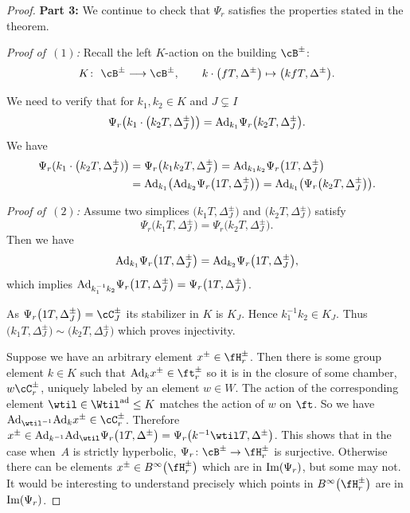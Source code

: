 \begin{proof}
{\bf Part 3:} We continue to check that $\Psi_r$ satisfies the properties stated in the theorem.

{\em Proof of~$(1)$:} Recall the left $K$-action on the building $\cB^\pm$:
\begin{displaymath}
K\colon \ \cB^\pm \longrightarrow \cB^\pm,\qquad k\cdot \big(fT, \Delta^\pm\big)\mapsto \big(kfT, \Delta^\pm\big).
\end{displaymath}

We need to verify that for $k_1,k_2\in K$ and $J\subsetneq I$
\[\Psi_r\big( k_1 \cdot\big(k_2T, \Delta^\pm_J\big)\big)={\rm Ad}_{k_1} \Psi_r\big(k_2 T, \Delta^\pm_J\big).\]
We have
\begin{align*}
\Psi_r (k_1\cdot \big(k_2 T, \Delta^\pm_J)\big)&=\Psi_r\big(k_1k_2T, \Delta^\pm_J\big)={\rm Ad}_{k_1k_2} \Psi_r\big(1 T, \Delta^\pm_J\big) \\
&={\rm Ad}_{k_1} \big({\rm Ad}_{k_2} \Psi_r\big(1 T,\Delta^\pm_J\big)\big)= {\rm Ad}_{k_1}\big(\Psi_r\big(k_2T, \Delta^\pm_J\big)\big).
\end{align*}

{\it Proof of~$(2)$:}
Assume two simplices $\big(k_1T, \Delta_J^\pm\big)$ and $\big(k_2T, \Delta_J^\pm\big)$ satisfy
\[\Psi_r\big(k_1T, \Delta_J^\pm\big)=\Psi_r\big(k_2T, \Delta_J^\pm\big).\]
Then we have
\[{\rm Ad}_{k_1} \Psi_r\big(1T, \Delta_J^\pm\big)={\rm Ad}_{k_2} \Psi_r\big(1T, \Delta_J^\pm\big),\]
which implies ${\rm Ad}_{k_1^{-1}k_2}\Psi_r\big(1T, \Delta_J^\pm\big)=\Psi_r\big(1T, \Delta_J^\pm\big)$.

As $\Psi_r\big(1T, \Delta_J^\pm\big)=\cC^\pm_J$ its stabilizer in $K$ is $K_J$. Hence $k_1^{-1}k_2\in K_J$.
Thus $\big(k_1T, \Delta_J^\pm\big)\sim\big(k_2T, \Delta_J^\pm\big)$ which proves injectivity.

Suppose we have an arbitrary element $x^\pm\in\fH_r^\pm$. Then there is some group element $k\in K$ such that
${\rm Ad}_k x^\pm\in \ft^\pm_r$ so it is in the closure of some chamber, $w\cC_r^\pm$, uniquely labeled by an element $w\in W$.
The action of the corresponding element $\wtil\in\Wtil^{\rm ad}\leq K$ matches the action of $w$ on $\ft$. So we have
${\rm Ad}_{\wtil^{-1}} {\rm Ad}_k x^\pm\in \cC^\pm_r$. Therefore
$x^\pm\in {\rm Ad}_{k^{-1}} {\rm Ad}_{\wtil} \Psi_r\big(1T, \Delta^\pm\big)=\Psi_r\big(k^{-1} \wtil T, \Delta^\pm\big)$.
This shows that in the case when~$A$ is strictly hyperbolic, $\Psi_r\colon \cB^\pm\to \fH_r^\pm$ is surjective. Otherwise there can be elements
$x^\pm\in B^\infty\big(\fH_r^\pm\big)$ which are in ${\rm Im}(\Psi_r)$, but some may not. It would be interesting to understand precisely which points in $B^\infty\big(\fH_r^\pm\big)$ are in ${\rm Im}(\Psi_r)$.


\end{proof}
